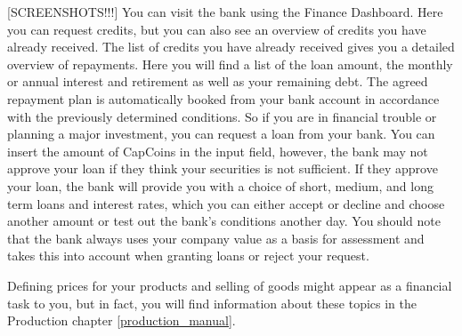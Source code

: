 [SCREENSHOTS!!!] You can visit the bank using the Finance Dashboard. Here you can request credits, but you can also see an overview of credits you have already received.
The list of credits you have already received gives you a detailed overview of repayments. Here you will find a list of the loan amount, the monthly or annual interest and retirement as well as your remaining debt. The agreed repayment plan is automatically booked from your bank account in accordance with the previously determined conditions.
So if you are in financial trouble or planning a major investment, you can request a loan from your bank. You can insert the amount of CapCoins in the input field, however, the bank may not approve your loan if they think your securities is not sufficient. If they approve your loan, the bank will provide you with a choice of short, medium, and long term loans and interest rates, which you can either accept or decline and choose another amount or test out the bank's conditions another day. You should note that the bank always uses your company value as a basis for assessment and takes this into account when granting loans or reject your request. 

Defining prices for your products and selling of goods might appear as a financial task to you, but in fact, you will find information about these topics in the Production chapter \ref{production_manual}.